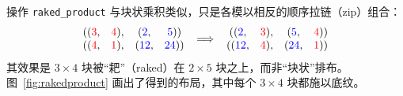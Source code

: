 操作 {\tt raked\_product} 与块状乘积类似，只是各模以相反的顺序拉链（zip）组合：
\begin{align*}
\begin{array}{cccc}((\textcolor{red}{3}, & \textcolor{red}{4}), & (\textcolor{blue}{2}, & \textcolor{blue}{5})) \\ ((\textcolor{red}{4}, & \textcolor{red}{1}), & (\textcolor{blue}{12}, & \textcolor{blue}{24})) \end{array}
\ \Longrightarrow \
\begin{array}{cccc}((\textcolor{blue}{2}, & \textcolor{red}{3}), & (\textcolor{blue}{5}, & \textcolor{red}{4})) \\ ((\textcolor{blue}{12}, & \textcolor{red}{4}), & (\textcolor{blue}{24}, & \textcolor{red}{1})) \end{array}
\end{align*}
其效果是 $3 {\times} 4$ 块被“耙”（raked）在 $2 {\times} 5$ 块之上，而非“块状”排布。图~\ref{fig:rakedproduct} 画出了得到的布局，其中每个 $3 {\times} 4$ 块都施以底纹。

